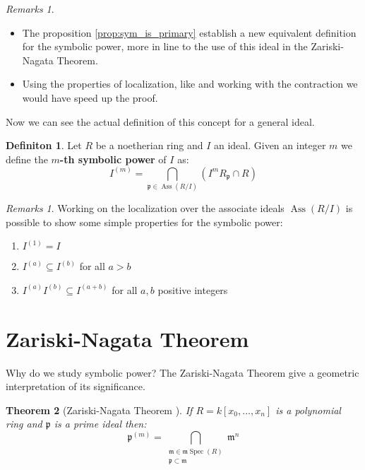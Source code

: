 \documentclass[notitlepage, a4]{book}
\theoremstyle{plain}
\newtheorem{teo}{Theorem}[section]
\theoremstyle{remark}
\newtheorem{rems}[rem]{Remarks}
\theoremstyle{definition}
\newtheorem{deff}[teo]{Definiton}
\newcommand{\p}{\mathfrak{p}}
\newcommand{\mm}{\mathfrak{m}}
\DeclareMathOperator{\Ass}{Ass}
\DeclareMathOperator{\Spec}{Spec}
\begin{document}
	\begin{rems}
		\begin{itemize}
		\item The proposition \ref{prop:sym_is_primary} establish a new equivalent definition for the symbolic power, more in line to the use of this ideal in the Zariski-Nagata Theorem.
		\item Using the properties of localization, like \cite[Proposition 4.8]{AMCD} and working with the contraction we would have speed up the proof.
		\end{itemize}
	\end{rems}
	
Now we can see the actual definition of this concept for a general ideal.

\begin{deff}
	Let $ R $ be a noetherian ring and $ I $ an ideal. Given an integer $ m $ we define the \textbf{$ m $-th symbolic power} of $ I $ as:
	\begin{equation}\label{eq:sym_pow_def}
		I^{(m)} = \bigcap_{\p \in \Ass(R/I) } (I^m R_\p \cap R)
	\end{equation}
\end{deff}

\begin{rems} \label{rem:symb_basic}
Working on the localization over the associate ideals $ \Ass(R/I) $ is possible to show some simple properties for the symbolic power:
\begin{enumerate}
\item $ I^{(1)}=I $
\item $ I^{(a)} \subseteq I^{(b)} $ for all $ a > b $
\item $ I^{(a)}I^{(b)}\subseteq I^{(a+b)} $ for all $ a,b $ positive integers
\end{enumerate}
\end{rems}



\section{Zariski-Nagata Theorem}
Why do we study symbolic power? The Zariski-Nagata Theorem give a geometric interpretation of its significance.

\begin{teo}[Zariski-Nagata Theorem \cite{Zar49, Nagata62}] \label{teo:zarnaga}
	If $ R = k[x_0 , ... , x_n] $ is a polynomial ring and $ \p $ is a prime ideal then:
	\begin{equation}\label{eq:zar_nag_teo}
	\p^{(m)} = \bigcap_{\substack{ \mm \in \mm\Spec (R)\\ \p \subset \mm}} \mm ^n
	\end{equation}
\end{teo}
\end{document}
